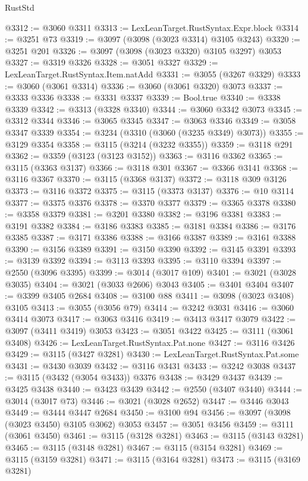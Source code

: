 \begin{lexlean}{RustStd}
\begin{coremodule}
@3312 := @3060 @3311
@3313 := LexLeanTarget.RustSyntax.Expr.block
@3314 := @3251 @73
@3319 := @3097 (@3098 (@3023 @3314) @3105 @3243)
@3320 := @3251 @201
@3326 := @3097 (@3098 (@3023 @3320) @3105 @3297) @3053
@3327 := @3319 @3326
@3328 := @3051 @3327
@3329 := LexLeanTarget.RustSyntax.Item.natAdd
@3331 := @3055 (@3267 @3329)
@3333 := @3060 (@3061 @3314)
@3336 := @3060 (@3061 @3320) @3073
@3337 := @3333 @3336
@3338 := @3331 @3337
@3339 := Bool.true
@3340 := @3338 @3339
@3342 := @3313 (@3328 @3340)
@3344 := @3060 @3342 @3073
@3345 := @3312 @3344
@3346 := @3065 @3345
@3347 := @3063 @3346
@3349 := @3058 @3347 @3339
@3354 := @3234 (@3310 (@3060 (@3235 @3349) @3073))
@3355 := @3129 @3354
@3358 := @3115 (@3214 (@3232 @3355))
@3359 := @3118 @291
@3362 := @3359 (@3123 (@3123 @3152))
@3363 := @3116 @3362
@3365 := @3115 (@3363 @3137)
@3366 := @3118 @301
@3367 := @3366 @3141
@3368 := @3116 @3367
@3370 := @3115 (@3368 @3137)
@3372 := @3118 @309 @3126
@3373 := @3116 @3372
@3375 := @3115 (@3373 @3137)
@3376 := @10 @3114
@3377 := @3375 @3376
@3378 := @3370 @3377
@3379 := @3365 @3378
@3380 := @3358 @3379
@3381 := @3201 @3380
@3382 := @3196 @3381
@3383 := @3191 @3382
@3384 := @3186 @3383
@3385 := @3181 @3384
@3386 := @3176 @3385
@3387 := @3171 @3386
@3388 := @3166 @3387
@3389 := @3161 @3388
@3390 := @3156 @3389
@3391 := @3150 @3390
@3392 := @3145 @3391
@3393 := @3139 @3392
@3394 := @3113 @3393
@3395 := @3110 @3394
@3397 := @2550 (@3096 @3395)
@3399 := @3014 (@3017 @109)
@3401 := @3021 (@3028 @3035)
@3404 := @3021 (@3033 @2606) @3043
@3405 := @3401 @3404
@3407 := @3399 @3405 @2684
@3408 := @3100 @88
@3411 := @3098 (@3023 @3408) @3105
@3413 := @3055 (@3056 @79)
@3414 := @3242 @3031
@3416 := @3060 @3414 @3073
@3417 := @3063 @3416
@3419 := @3413 @3417 @3079
@3422 := @3097 (@3411 @3419) @3053
@3423 := @3051 @3422
@3425 := @3111 (@3061 @3408)
@3426 := LexLeanTarget.RustSyntax.Pat.none
@3427 := @3116 @3426
@3429 := @3115 (@3427 @3281)
@3430 := LexLeanTarget.RustSyntax.Pat.some
@3431 := @3430 @3039
@3432 := @3116 @3431
@3433 := @3242 @3038
@3437 := @3115 (@3432 (@3054 @3433)) @3376
@3438 := @3429 @3437
@3439 := @3425 @3438
@3440 := @3423 @3439
@3442 := @2550 (@3407 @3440)
@3444 := @3014 (@3017 @73)
@3446 := @3021 (@3028 @2652)
@3447 := @3446 @3043
@3449 := @3444 @3447 @2684
@3450 := @3100 @94
@3456 := @3097 (@3098 (@3023 @3450) @3105 @3062) @3053
@3457 := @3051 @3456
@3459 := @3111 (@3061 @3450)
@3461 := @3115 (@3128 @3281)
@3463 := @3115 (@3143 @3281)
@3465 := @3115 (@3148 @3281)
@3467 := @3115 (@3154 @3281)
@3469 := @3115 (@3159 @3281)
@3471 := @3115 (@3164 @3281)
@3473 := @3115 (@3169 @3281)

\end{coremodule}
\end{lexlean}
